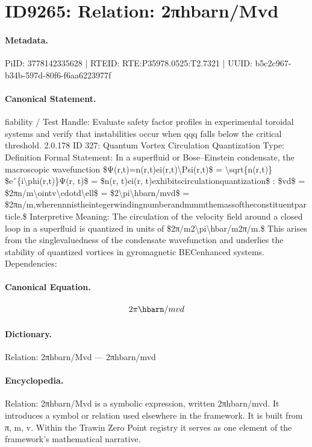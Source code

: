 \section*{ID9265: Relation: 2πhbarn/Mvd}
\paragraph{Metadata.}
PiID: 3778142335628 | RTEID: RTE:P35978.0525:T2.7321 | UUID: b5c2c967-b34b-597d-80f6-f6aa6223977f

\paragraph{Canonical Statement.}
fiability / Test Handle: Evaluate safety factor profiles in experimental toroidal systems and verify that instabilities occur when qqq falls below the critical threshold. 2.0.178 ID 327: Quantum Vortex Circulation Quantization Type: Definition Formal Statement: In a superfluid or Bose–Einstein condensate, the macroscopic wavefunction \$Ψ(r,t)=n(r,t)ei(r,t)\textbackslash{}Psi(r,t)\$ = \textbackslash{}sqrt\{n(r,t)\} \$eˆ\{i\textbackslash{}phi(r,t)\}Ψ(r, t)\$ = \$n(r, t)ei(r, t)exhibitscirculationquantization\$ : \$vd\$ = \$2πn/m\textbackslash{}ointv\textbackslash{}cdotd\textbackslash{}ell\$ = \$2\textbackslash{}pi\textbackslash{}hbarn/mvd\$ = \$2πn/m,wherennnistheintegerwindingnumberandmmmthemassoftheconstituentparticle.\$ Interpretive Meaning: The circulation of the velocity field around a closed loop in a superfluid is quantized in units of \$2π/m2\textbackslash{}pi\textbackslash{}hbar/m2π/m.\$ This arises from the singlevaluedness of the condensate wavefunction and underlies the stability of quantized vortices in gyromagnetic BECenhanced systems. Dependencies:

\paragraph{Canonical Equation.}
\[
2\pi\hbarn/mvd
\]

\paragraph{Dictionary.}
Relation: 2πhbarn/Mvd — 2πhbarn/mvd

\paragraph{Encyclopedia.}
Relation: 2πhbarn/Mvd is a symbolic expression, written 2πhbarn/mvd. It introduces a symbol or relation used elsewhere in the framework. It is built from π, m, v. Within the Trawin Zero Point registry it serves as one element of the framework's mathematical narrative.
